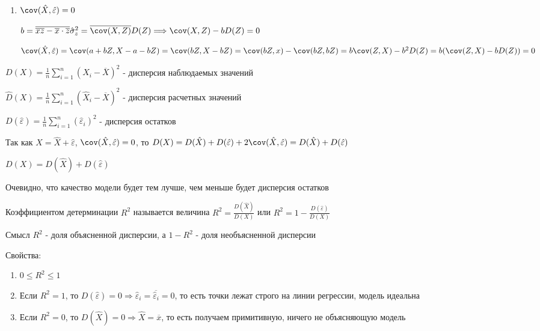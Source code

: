 \documentclass[12pt]{article}
\begin{document}
\begin{enumerate}
\begin{enumerate}
        \item $\cov (\hat X, \hat \varepsilon) = 0$

        \begin{MyProof}
            $b = \overline{\overline{xz} - \overline{x} \cdot \overline{z}}{\hat \sigma^2_z} = \overline{\cov (X, Z)}{D(Z)} \Longrightarrow \cov (X, Z) - b D(Z) = 0$

            $\cov (\hat X, \hat \varepsilon) = \cov (a + b Z, X - a - bZ) = \cov (bZ, X - bZ) = \cov (bZ, x) - \cov (bZ, bZ) = b \cov (Z, X) - b^2 D(Z) = b (\cov (Z, X) - b D(Z)) = 0$
        \end{MyProof}
    \end{enumerate}

    \Def $D(X) = \frac{1}{n} \sum_{i = 1}^n (X_i - \overline{X})^2$ - дисперсия наблюдаемых значений

    \Defs $\hat D(X) = \frac{1}{n} \sum_{i = 1}^n (\hat X_i - \overline{X})^2$ - дисперсия расчетных значений

    \Defs $D(\hat \varepsilon) = \frac{1}{n} \sum_{i = 1}^n (\hat \varepsilon_i)^2$ - дисперсия остатков

    Так как $X = \hat X + \hat \varepsilon$, $\cov (\hat X, \hat \varepsilon) = 0$, то $D(X) = D(\hat X) + D(\hat \varepsilon) + 2\cov (\hat X, \hat \varepsilon) = D(\hat X) + D(\hat \varepsilon)$

    \begin{MyTheorem}
        \Ths $D(X) = D(\hat X) + D(\hat \varepsilon)$
    \end{MyTheorem}

    Очевидно, что качество модели будет тем лучше, чем меньше будет дисперсия остатков

    \Def Коэффициентом детерминации $R^2$ называется величина $R^2 = \frac{D(\hat X)}{D(X)}$ или $R^2 = 1 - \frac{D(\hat \varepsilon)}{D(X)}$

    \Notas Смысл $R^2$ - доля объясненной дисперсии, а $1 - R^2$ - доля необъясненной дисперсии

    Свойства: 

    \begin{enumerate}
        \item $0 \leq R^2 \leq 1$
        \item Если $R^2 = 1$, то $D(\hat \varepsilon) = 0 \Longrightarrow \hat \varepsilon_i = \overline{\hat \varepsilon_i} = 0$, то есть точки лежат строго на 
        линии регрессии, модель идеальна

        \item Если $R^2 = 0$, то $D(\hat X) = 0 \Longrightarrow \hat X = \overline{x}$, то есть получаем примитивную, ничего не объясняющую модель
    \end{enumerate}


\end{enumerate}
\end{document}
